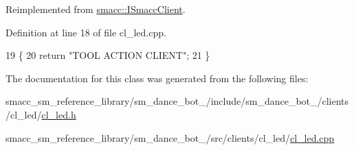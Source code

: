 Reimplemented from \hyperlink{classsmacc_1_1ISmaccClient_a20846aabfd1de832aa27d7a8237a1742}{smacc\+::\+I\+Smacc\+Client}.



Definition at line 18 of file cl\+\_\+led.\+cpp.


\begin{DoxyCode}
19 \{
20     \textcolor{keywordflow}{return} \textcolor{stringliteral}{"TOOL ACTION CLIENT"};
21 \}
\end{DoxyCode}


The documentation for this class was generated from the following files\+:\begin{DoxyCompactItemize}
\item 
smacc\+\_\+sm\+\_\+reference\+\_\+library/sm\+\_\+dance\+\_\+bot\+\_/include/sm\+\_\+dance\+\_\+bot\+\_/clients/cl\+\_\+led/\hyperlink{3_2include_2sm__dance__bot__3_2clients_2cl__led_2cl__led_8h}{cl\+\_\+led.\+h}\item 
smacc\+\_\+sm\+\_\+reference\+\_\+library/sm\+\_\+dance\+\_\+bot\+\_/src/clients/cl\+\_\+led/\hyperlink{3_2src_2clients_2cl__led_2cl__led_8cpp}{cl\+\_\+led.\+cpp}\end{DoxyCompactItemize}
